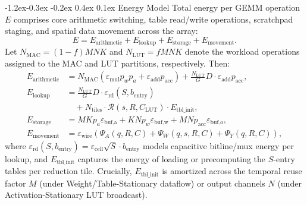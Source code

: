 \documentclass[10pt,letterpaper,twocolumn]{article}
\makeatletter
\renewcommand\subsection{\@startsection{subsection}{2}{\z@}%
  {-1.2ex\@plus -0.3ex \@minus -0.2ex}%
  {0.4ex \@plus 0.1ex}%
  {\normalfont\normalsize\bfseries}}
\makeatother
\begin{document}
\subsection{Energy Model}
Total energy per GEMM operation $E$ comprises core arithmetic switching, table read/write operations, scratchpad staging, and spatial data movement across the array:
\begin{equation}
  E = E_{\text{arithmetic}} + E_{\text{lookup}} + E_{\text{storage}} + E_{\text{movement}}.
  \label{eq:energy_total}
\end{equation}
Let $N_{\text{MAC}} = (1 - f) M N K$ and $N_{\text{LUT}} = f M N K$ denote the workload operations assigned to the MAC and LUT partitions, respectively. Then:
\begin{align}
  E_{\text{arithmetic}} &= N_{\text{MAC}} \left( \varepsilon_{\text{mul}} p_w p_a + \varepsilon_{\text{add}} p_{\text{acc}} \right) + \frac{N_{\text{LUT}}}{G} D \cdot \varepsilon_{\text{add}} p_{\text{acc}}, \\
  E_{\text{lookup}}     &= \frac{N_{\text{LUT}}}{G} D \cdot \varepsilon_{\text{rd}}\!\left(S, b_{\text{entry}}\right) \nonumber \\
                        &\quad + N_{\text{tiles}} \cdot \mathcal{R}(s, R, C_{\text{LUT}}) \cdot E_{\text{tbl\_init}}, \\
  E_{\text{storage}}    &= M K p_a \varepsilon_{\text{buf,a}} + K N p_w \varepsilon_{\text{buf,w}} + M N p_{\text{acc}} \varepsilon_{\text{buf,o}}, \\
  E_{\text{movement}}   &= \varepsilon_{\text{wire}} \left( \Psi_A(q, R, C) + \Psi_W(q, s, R, C) + \Psi_Y(q, R, C) \right),
\end{align}
where $\varepsilon_{\text{rd}}(S, b_{\text{entry}}) = \varepsilon_{\text{cell}} \sqrt{S} \cdot b_{\text{entry}}$ models capacitive bitline/mux energy per lookup, and $E_{\text{tbl\_init}}$ captures the energy of loading or precomputing the $S$-entry tables per reduction tile. Crucially, $E_{\text{tbl\_init}}$ is amortized across the temporal reuse factor $M$ (under Weight/Table-Stationary dataflow) or output channels $N$ (under Activation-Stationary LUT broadcast).
\end{document}

